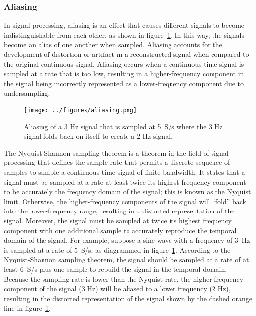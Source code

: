 \documentclass[12pt,letter]{article}
\begin{document}
\subsubsection{Aliasing}





In signal processing, aliasing is an effect that causes different signals to become indistinguishable from each other, as shown in figure~\ref{fig:aliasing}.  In this way, the signals become an alias of one another when sampled. Aliasing accounts for the development of distortion or artifact in a reconstructed signal when compared to the original continuous signal. Aliasing occurs when a continuous-time signal is sampled at a rate that is too low, resulting in a higher-frequency component in the signal being incorrectly represented as a lower-frequency component due to undersampling.

\begin{figure}[H]
    \centering
    \texttt{[image: ../figures/aliasing.png]}
    \caption{Aliasing of a 3 Hz signal that is sampled at 5~S/s where the 3 Hz signal folds back on itself to create a 2 Hz signal.}
    \label{fig:aliasing}
\end{figure}

The Nyquist-Shannon sampling theorem is a theorem in the field of signal processing that defines the sample rate that permits a discrete sequence of samples to sample a continuous-time signal of finite bandwidth. It states that a signal must be sampled at a rate at least twice its highest frequency component to be accurately the frequency domain of the signal; this is known as the Nyquist limit. Otherwise, the higher-frequency components of the signal will ``fold'' back into the lower-frequency range, resulting in a distorted representation of the signal. Moreover, the signal must be sampled at twice its highest frequency component with one additional sample to accurately reproduce the temporal domain of the signal. For example, suppose a sine wave with a frequency of 3~Hz is sampled at a rate of 5~S/s; as diagrammed in figure~\ref{fig:aliasing}. According to the Nyquist-Shannon sampling theorem, the signal should be sampled at a rate of at least 6~S/s plus one sample to rebuild the signal in the temporal domain. Because the sampling rate is lower than the Nyquist rate, the higher-frequency component of the signal (3 Hz) will be aliased to a lower frequency (2 Hz), resulting in the distorted representation of the signal shown by the dashed orange line in figure~\ref{fig:aliasing}.
\end{document}
